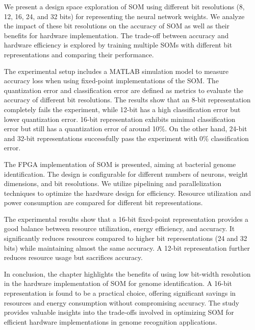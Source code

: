 We present a design space exploration of SOM using different bit resolutions (8, 12, 16, 24, and 32 bits) for representing the neural network weights. We analyze the impact of these bit resolutions on the accuracy of SOM as well as their benefits for hardware implementation. The trade-off between accuracy and hardware efficiency is explored by training multiple SOMs with different bit representations and comparing their performance.

The experimental setup includes a MATLAB simulation model to measure accuracy loss when using fixed-point implementations of the SOM. The quantization error and classification error are defined as metrics to evaluate the accuracy of different bit resolutions. The results show that an 8-bit representation completely fails the experiment, while 12-bit has a high classification error but lower quantization error. 16-bit representation exhibits minimal classification error but still has a quantization error of around 10\%. On the other hand, 24-bit and 32-bit representations successfully pass the experiment with 0\% classification error.

The FPGA implementation of SOM is presented, aiming at bacterial genome identification. The design is configurable for different numbers of neurons, weight dimensions, and bit resolutions. We utilize pipelining and parallelization techniques to optimize the hardware design for efficiency. Resource utilization and power consumption are compared for different bit representations.

The experimental results show that a 16-bit fixed-point representation provides a good balance between resource utilization, energy efficiency, and accuracy. It significantly reduces resources compared to higher bit representations (24 and 32 bits) while maintaining almost the same accuracy. A 12-bit representation further reduces resource usage but sacrifices accuracy.

In conclusion, the chapter highlights the benefits of using low bit-width resolution in the hardware implementation of SOM for genome identification. A 16-bit representation is found to be a practical choice, offering significant savings in resources and energy consumption without compromising accuracy. The study provides valuable insights into the trade-offs involved in optimizing SOM for efficient hardware implementations in genome recognition applications.